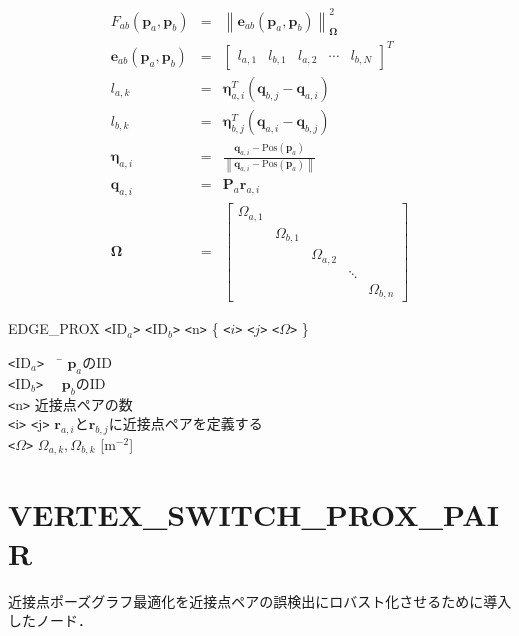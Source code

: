 \documentclass[dvipdfmx]{jsarticle}
\begin{document}
\begin{eqnarray}
	F_{ab} \left( \bm{p}_a, \bm{p}_b \right) &=& \left\| \bm{e}_{ab} \left( \bm{p}_a, \bm{p}_b \right) \right\|_{\bm{\Omega}}^2 \\
	\bm{e}_{ab} \left( \bm{p}_a, \bm{p}_b \right) &=& \left[ \begin{array}{ccccc}
		l_{a,1} & l_{b,1} & l_{a,2} & \cdots & l_{b,N}
	\end{array} \right]^T \\
	l_{a,k} &=& \bm{\eta}_{a,i}^T \left( \bm{q}_{b,j} - \bm{q}_{a,i} \right) \nonumber \\
	l_{b,k} &=& \bm{\eta}_{b,j}^T \left( \bm{q}_{a,i} - \bm{q}_{b,j} \right) \nonumber \\
	\bm{\eta}_{a,i} &=& \frac{\bm{q}_{a,i} - \mathrm{Pos}\left( \bm{p}_a \right) }{\left\| \bm{q}_{a,i} - \mathrm{Pos}\left( \bm{p}_a \right) \right\|} \nonumber \\
	\bm{q}_{a,i} &=& \bm{P}_a \bm{r}_{a,i} \nonumber \\
	\bm{\Omega} &=& \left[ \begin{array}{ccccc} 
		\Omega_{a,1} &&&& \\
		& \Omega_{b,1} &&& \\
		&& \Omega_{a,2} && \\
		&&& \ddots & \\
		&&&& \Omega_{b,n}
	\end{array} \right] \nonumber
\end{eqnarray}

EDGE\_PROX \verb|<|ID$_a$\verb|>| \verb|<|ID$_b$\verb|>| \verb|<|n\verb|>| \{ \verb|<|$i$\verb|>| \verb|<|$j$\verb|>| \verb|<|$\Omega$\verb|>| \}

\begin{tabbing}
	\verb|<|ID$_a$\verb|>|　						\= $\bm{p}_a$のID \\
	\verb|<|ID$_b$\verb|>|　 						\> $\bm{p}_b$のID \\
	\verb|<|n\verb|>| 							\> 近接点ペアの数 \\
	\verb|<|i\verb|>| \verb|<|j\verb|>|				\> $\bm{r}_{a,i}$と$\bm{r}_{b,j}$に近接点ペアを定義する \\
	\verb|<|$\Omega$\verb|>|					\> $\Omega_{a,k}, \Omega_{b,k}$ [m$^{-2}$]
\end{tabbing}

\clearpage

\section{VERTEX\_SWITCH\_PROX\_PAIR}
近接点ポーズグラフ最適化を近接点ペアの誤検出にロバスト化させるために導入したノード．
\end{document}
